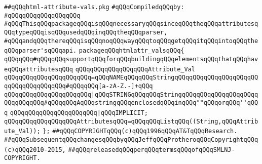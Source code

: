 \label{src/lib/html/html-attribute-vals.pkg}
\verb|##qQQqhtml-attribute-vals.pkg|\newline
\newline
\verb|#qQQqCompiledqQQqby:|\newline
\verb|#qQQqqQQqqQQqqQQqqQQq|\newline
\newline
\verb|#qQQqThisqQQqpackageqQQqisqQQqnecessaryqQQqsinceqQQqtheqQQqattributesqQQqtypeqQQqisqQQqusedqQQqinqQQqtheqQQqparser,|\newline
\verb|#qQQqandqQQqthereqQQqisqQQqnoqQQqwayqQQqtoqQQqgetqQQqitqQQqintoqQQqtheqQQqparser'sqQQqapi.|\newline
\newline
\newline
\verb|packageqQQqhtmlattr_valsqQQq{|\newline
\newline
\newline
\verb|qQQqqQQq#qQQqqQQqsupportqQQqforqQQqbuildingqQQqelementsqQQqthatqQQqhaveqQQqattributesqQQq|\newline
\verb|qQQqqQQqqQQqqQQqqQQqAttribute_Val|\newline
\verb|qQQqqQQqqQQqqQQqqQQqqQQq=qQQqNAMEqQQqqQQqStringqQQqqQQqqQQqqQQqqQQqqQQqqQQqqQQqqQQqqQQq#qQQqqQQq[a-zA-Z.-]+qQQq|\newline
\verb|qQQqqQQqqQQqqQQqqQQqqQQq|\verb#|qQQqSTRINGqQQqqQQqStringqQQqqQQqqQQqqQQqqQQqqQQqqQQqqQQq#\verb|#qQQqqQQqAqQQqstringqQQqenclosedqQQqinqQQq""qQQqorqQQq''qQQq|\newline
\verb|qQQqqQQqqQQqqQQqqQQqqQQq|\verb#|qQQqIMPLICIT;#\newline
\newline
\verb|qQQqqQQqqQQqqQQqqQQqAttributesqQQq=qQQqqQQqListqQQq((String,qQQqAttribute_Val));|\newline
\newline
\verb|};|\newline
\newline
\newline
\verb|##qQQqCOPYRIGHTqQQq(c)qQQq1996qQQqAT&TqQQqResearch.|\newline
\verb|##qQQqSubsequentqQQqchangesqQQqbyqQQqJeffqQQqProtheroqQQqCopyrightqQQq(c)qQQq2010-2015,|\newline
\verb|##qQQqreleasedqQQqperqQQqtermsqQQqofqQQqSMLNJ-COPYRIGHT.|\newline

